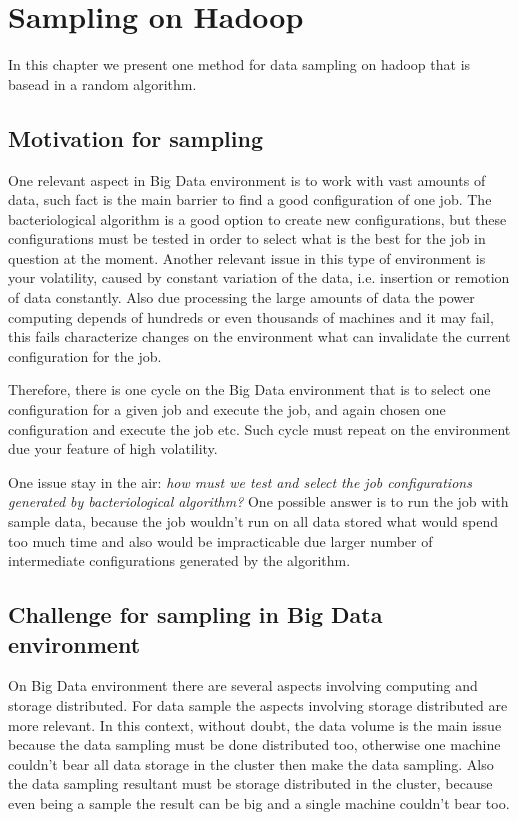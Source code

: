 \chapter{Sampling on Hadoop} %
\label{cha:sample}

In this chapter we present one method for data sampling on hadoop that is basead
in a random algorithm.

\section{Motivation for sampling}

One relevant aspect in Big Data environment is to work with vast amounts of data,
such fact is the main barrier to find a good configuration of one job. The bacteriological
algorithm is a good option to create new configurations, but these configurations
must be tested in order to select what is the best for the job in question at the
moment. Another relevant issue in this type of environment is your volatility, caused
by constant variation of the data, i.e. insertion or remotion of data constantly.
Also due processing the large amounts of data the power computing depends of hundreds
or even thousands of machines and it may fail, this fails characterize changes on
the environment what can invalidate the current configuration for the job.

Therefore, there is one cycle on the Big Data environment that is to select one
configuration for a given job and execute the job, and again chosen one configuration
and execute the job etc. Such cycle must repeat on the environment due your feature
of high volatility.

One issue stay in the air: {\it how must we test and select the job configurations
generated by bacteriological algorithm?} One possible answer is to run the job with
sample data, because the job wouldn't run on all data stored what would spend too
much time and also would be impracticable due larger number of intermediate
configurations generated by the algorithm.

\section{Challenge for sampling in Big Data environment}

On Big Data environment there are several aspects involving computing and storage
distributed. For data sample the aspects involving storage distributed are more
relevant. In this context, without doubt, the data volume is the main issue because
the data sampling must be done distributed too, otherwise one machine couldn't bear
all data storage in the cluster then make the data sampling. Also the data sampling
resultant must be storage distributed in the cluster, because even being a sample
the result can be big and a single machine couldn't bear too.

